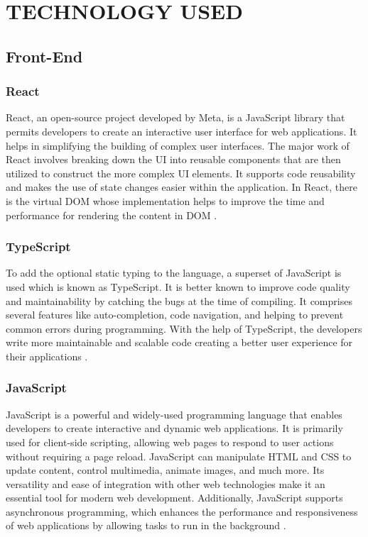 \chapter{TECHNOLOGY USED}

\section{Front-End}

\subsection{React}
React, an open-source project developed by Meta, is a JavaScript library that permits developers to create an interactive user interface for web applications. It helps in simplifying the building of complex user interfaces. The major work of React involves breaking down the UI into reusable components that are then utilized to construct the more complex UI elements. It supports code reusability and makes the use of state changes easier within the application. In React, there is the virtual DOM whose implementation helps to improve the time and performance for rendering the content in DOM \cite{react2025}.

\subsection{TypeScript}
To add the optional static typing to the language, a superset of JavaScript is used which is known as TypeScript. It is better known to improve code quality and maintainability by catching the bugs at the time of compiling. It comprises several features like auto-completion, code navigation, and helping to prevent common errors during programming. With the help of TypeScript, the developers write more maintainable and scalable code creating a better user experience for their applications \cite{typescript2025}.

\subsection{JavaScript}
JavaScript is a powerful and widely-used programming language that enables developers to create interactive and dynamic web applications. It is primarily used for client-side scripting, allowing web pages to respond to user actions without requiring a page reload. JavaScript can manipulate HTML and CSS to update content, control multimedia, animate images, and much more. Its versatility and ease of integration with other web technologies make it an essential tool for modern web development. Additionally, JavaScript supports asynchronous programming, which enhances the performance and responsiveness of web applications by allowing tasks to run in the background \cite{javascript2025}.

